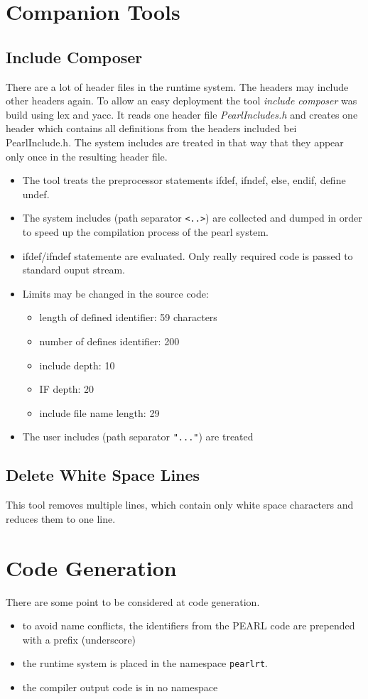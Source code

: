 \section{Companion Tools}
\subsection{Include Composer}
There are a lot of header files in the runtime system. 
The headers may include other headers again.
To allow an easy deployment the tool {\em include composer} 
was build using lex and yacc. It reads one header file {\em PearlIncludes.h}
and creates one header which contains all definitions from the headers
included bei PearlInclude.h. The system includes are treated in that way
that they appear only once in the resulting header file.

\begin{itemize}
\item The tool treats the preprocessor statements 
ifdef, ifndef, else, endif, define undef.
\item The system includes (path separator \verb|<..>|) are collected
and dumped in order to speed up the compilation process of the 
pearl system.
\item ifdef/ifndef statemente are evaluated. Only really required code
   is passed to standard ouput stream.
\item Limits may be changed in the source code: 
   \begin{itemize}
   \item length of defined identifier: 59 characters
   \item number of defines identifier: 200
   \item include depth: 10
   \item IF depth: 20
   \item include file name length: 29
   \end{itemize}
\item The user includes (path separator \verb|"..."|) are treated
\end{itemize}
 

\subsection{Delete White Space Lines}
This tool removes multiple lines, which contain only white space characters
and reduces them to one line.

\section{Code Generation}
There are some point to be considered at code generation.
\begin{itemize}
\item to avoid name conflicts, the identifiers from the PEARL code
   are prepended with a prefix  (underscore)
\item the runtime system is placed in the namespace \verb|pearlrt|.
\item the compiler output code is in no namespace
\end{itemize}

